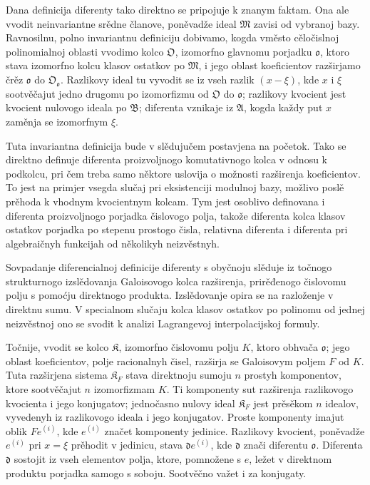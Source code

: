 \documentclass[11pt]{article}
\begin{document}
Dana definicija diferenty tako direktno se pripojuje k znanym faktam. Ona ale vvodit neinvariantne srědne članove, poněvadže ideal \(\mathfrak M\) zavisi od vybranoj bazy. Ravnosilnu, polno invariantnu definiciju dobivamo, kogda vměsto cěločislnoj polinomialnoj oblasti vvodimo kolco \(\mathfrak O\), izomorfno glavnomu porjadku \(\mathfrak o\), ktoro stava izomorfno kolcu klasov ostatkov po \(\mathfrak M\), i jego oblast koeficientov razširjamo črěz \(\mathfrak o\) do \(\mathfrak O_{\mathfrak o}\). Razlikovy ideal tu vyvodit se iz vseh razlik \((x-\xi)\), kde \(x\) i \(\xi\) sootvěčajut jedno drugomu po izomorfizmu od \(\mathfrak O\) do \(\mathfrak o\); razlikovy kvocient jest kvocient nulovogo ideala po \(\mathfrak B\); diferenta vznikaje iz \(\mathfrak A\), kogda každy put \(x\) zaměnja se izomorfnym \(\xi\).

Tuta invariantna definicija bude v slědujučem postavjena na početok. Tako se direktno definuje diferenta proizvoljnogo komutativnogo kolca v odnosu k podkolcu, pri čem treba samo něktore uslovija o možnosti razširenja koeficientov. To jest na primjer vsegda slučaj pri eksistenciji modulnoj bazy, možlivo poslě prěhoda k vhodnym kvocientnym kolcam. Tym jest osoblivo definovana i diferenta proizvoljnogo porjadka čislovogo polja, takože diferenta kolca klasov ostatkov porjadka po stepenu prostogo čisla, relativna diferenta i diferenta pri algebraičnyh funkcijah od několikyh neizvěstnyh.

Sovpadanje diferencialnoj definicije diferenty s obyčnoju slěduje iz točnogo strukturnogo izslědovanja Galoisovogo kolca razširenja, prirěđenogo čislovomu polju s pomoćju direktnogo produkta. Izslědovanje opira se na razloženje v direktnu sumu. V specialnom slučaju kolca klasov ostatkov po polinomu od jednej neizvěstnoj ono se svodit k analizi Lagrangevoj interpolacijskoj formuly.

Točnije, vvodit se kolco \(\mathfrak K\), izomorfno čislovomu polju \(K\), ktoro obhvača \(\mathfrak o\); jego oblast koeficientov, polje racionalnyh čisel, razširja se Galoisovym poljem \(F\) od \(K\). Tuta razširjena sistema \(\mathfrak K_F\) stava direktnoju sumoju \(n\) prostyh komponentov, ktore sootvěčajut \(n\) izomorfizmam \(K\). Ti komponenty sut razširenja razlikovogo kvocienta i jego konjugatov; jednočasno nulovy ideal \(\mathfrak K_F\) jest prěsěkom \(n\) idealov, vyvedenyh iz razlikovogo ideala i jego konjugatov. Proste komponenty imajut oblik \(Fe^{(i)}\), kde \(e^{(i)}\) značet komponenty jedinice. Razlikovy kvocient, poněvadže \(e^{(i)}\) pri \(x=\xi\) prěhodit v jedinicu, stava \(\mathfrak d e^{(i)}\), kde \(\mathfrak d\) znači diferentu \(\mathfrak o\). Diferenta \(\mathfrak d\) sostojit iz vseh elementov polja, ktore, pomnožene s \(e\), ležet v direktnom produktu porjadka samogo s soboju. Sootvěčno važet i za konjugaty.
\end{document}
